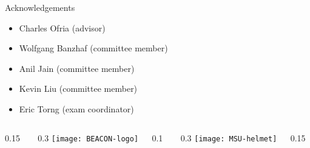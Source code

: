\appendix

\begin{frame}{Acknowledgements}
\begin{itemize}
\item Charles Ofria (advisor)
\item Wolfgang Banzhaf (committee member)
\item Anil Jain (committee member)
\item Kevin Liu (committee member)
\item Eric Torng (exam coordinator)
\end{itemize}
\vspace{-1ex}

\newcommand{\innerspacer}{0.1\textwidth}
\newcommand{\content}{0.3\textwidth}
\newcommand{\outerspacer}{0.15\textwidth}


\begin{center}
 \begin{columns}
	\begin{column}{\outerspacer}~\end{column}
	 \begin{column}{\content}
		\texttt{[image: BEACON-logo]}
 	\end{column}
  \begin{column}{\innerspacer}~\end{column}
 	\begin{column}{\content}
   \texttt{[image: MSU-helmet]}
 	\end{column}
 	\begin{column}{\outerspacer}~\end{column}
 \end{columns}
\end{center}

\end{frame}

